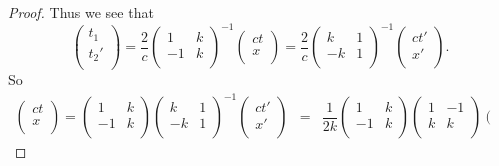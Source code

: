 \documentclass[12pt]{article}
\theoremstyle{defn}
\theoremstyle{pf}
\newcommand{\0}{\emptyset}
\renewcommand{\-}{\setminus}
\begin{document}
\begin{proof}
Thus we see that $$\left(\begin{array}{c}
         t_1\\
t_2'\\
        \end{array}\right)=\dfrac{2}{c}\left(\begin{array}{cc}
1 & k\\
-1 & k\\
\end{array}\right)^{-1}\left(\begin{array}{c}
ct\\
x\\
\end{array}\right)=\dfrac{2}{c}\left(\begin{array}{cc}
k & 1\\
-k & 1\\
\end{array}\right)^{-1}\left(\begin{array}{c}
ct'\\
x'\\
\end{array}\right).$$ So \begin{eqnarray*}\left(\begin{array}{c}
         ct\\
x\\
        \end{array}\right)=\left(\begin{array}{cc}
1 & k\\
-1 & k\\
\end{array}\right)\left(\begin{array}{cc}
k & 1\\
-k & 1\\
\end{array}\right)^{-1}\left(\begin{array}{c}
ct'\\
x'\\
\end{array}\right)&=&\dfrac{1}{2k}\left(\begin{array}{cc}
1 & k\\
-1 & k\\
\end{array}\right)\left(\begin{array}{cc}
1 & -1\\
k & k\\
\end{array}\right)\left(\begin{array}{c}

\end{array}
\end{eqnarray*}
\end{proof}
\end{document}
